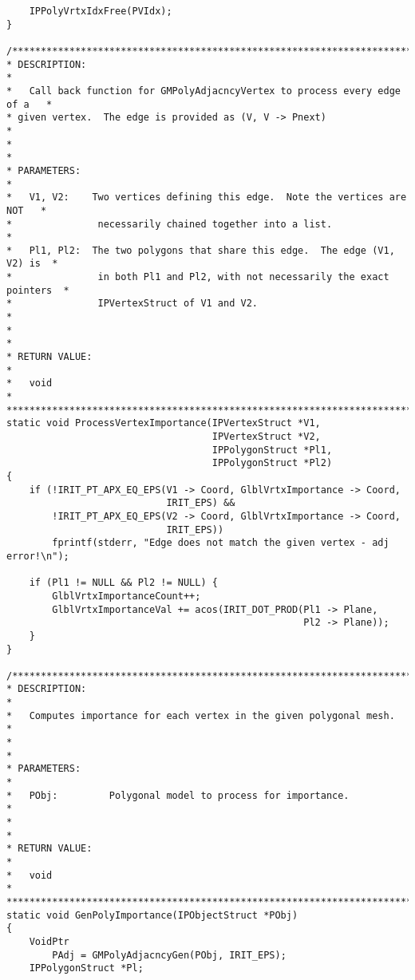 \begin{verbatim}
    IPPolyVrtxIdxFree(PVIdx);
}

/*****************************************************************************
* DESCRIPTION:                                                               *
*   Call back function for GMPolyAdjacncyVertex to process every edge of a   *
* given vertex.  The edge is provided as (V, V -> Pnext)                     *
*                                                                            *
* PARAMETERS:                                                                *
*   V1, V2:    Two vertices defining this edge.  Note the vertices are NOT   *
*               necessarily chained together into a list.                     *
*   Pl1, Pl2:  The two polygons that share this edge.  The edge (V1, V2) is  *
*               in both Pl1 and Pl2, with not necessarily the exact pointers  *
*               IPVertexStruct of V1 and V2.                                     *
*                                                                            *
* RETURN VALUE:                                                              *
*   void                                                                     *
*****************************************************************************/
static void ProcessVertexImportance(IPVertexStruct *V1,
                                    IPVertexStruct *V2,
                                    IPPolygonStruct *Pl1,
                                    IPPolygonStruct *Pl2)
{
    if (!IRIT_PT_APX_EQ_EPS(V1 -> Coord, GlblVrtxImportance -> Coord,
                            IRIT_EPS) &&
        !IRIT_PT_APX_EQ_EPS(V2 -> Coord, GlblVrtxImportance -> Coord,
                            IRIT_EPS))
        fprintf(stderr, "Edge does not match the given vertex - adj error!\n");

    if (Pl1 != NULL && Pl2 != NULL) {
        GlblVrtxImportanceCount++;
        GlblVrtxImportanceVal += acos(IRIT_DOT_PROD(Pl1 -> Plane,
                                                    Pl2 -> Plane));
    }
}

/*****************************************************************************
* DESCRIPTION:                                                               *
*   Computes importance for each vertex in the given polygonal mesh.         *
*                                                                            *
* PARAMETERS:                                                                *
*   PObj:         Polygonal model to process for importance.                     *
*                                                                            *
* RETURN VALUE:                                                              *
*   void                                                                     *
*****************************************************************************/
static void GenPolyImportance(IPObjectStruct *PObj)
{
    VoidPtr
        PAdj = GMPolyAdjacncyGen(PObj, IRIT_EPS);
    IPPolygonStruct *Pl;


\end{verbatim}
